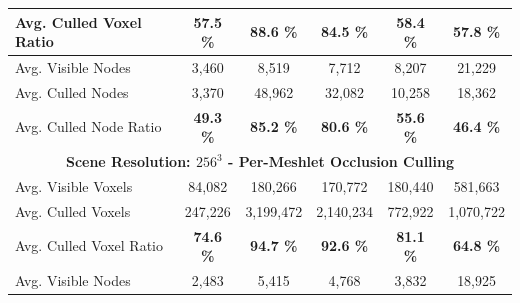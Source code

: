 \begin{table}[!htb]
\begin{tabular}{|lccccc|}
    \multicolumn{1}{|l|}{Avg. Culled Voxel Ratio}   & \multicolumn{1}{c|}{\textbf{57.5 \%}}         & \multicolumn{1}{c|}{\textbf{88.6 \%}}         & \multicolumn{1}{c|}{\textbf{84.5 \%}} & \multicolumn{1}{c|}{\textbf{58.4 \%}}     & \multicolumn{1}{c|}{\textbf{57.8 \%}}     \\ \hline
    \multicolumn{1}{|l|}{Avg. Visible Nodes}        & \multicolumn{1}{c|}{3,460}                    & \multicolumn{1}{c|}{8,519}                    & \multicolumn{1}{c|}{7,712}            & \multicolumn{1}{c|}{8,207}                & \multicolumn{1}{c|}{21,229}               \\
    \multicolumn{1}{|l|}{Avg. Culled Nodes}         & \multicolumn{1}{c|}{3,370}                    & \multicolumn{1}{c|}{48,962}                   & \multicolumn{1}{c|}{32,082}           & \multicolumn{1}{c|}{10,258}               & \multicolumn{1}{c|}{18,362}               \\
    \multicolumn{1}{|l|}{Avg. Culled Node Ratio}    & \multicolumn{1}{c|}{\textbf{49.3 \%}}         & \multicolumn{1}{c|}{\textbf{85.2 \%}}         & \multicolumn{1}{c|}{\textbf{80.6 \%}} & \multicolumn{1}{c|}{\textbf{55.6 \%}}     & \multicolumn{1}{c|}{\textbf{46.4 \%}}     \\ \hline
    \multicolumn{6}{|c|}{\textbf{Scene Resolution: $256^3$ - Per-Meshlet Occlusion Culling}}                                                                                                                                                                                        \\ \hline
    \multicolumn{1}{|l|}{Avg. Visible Voxels}       & \multicolumn{1}{c|}{84,082}                   & \multicolumn{1}{c|}{180,266}                  & \multicolumn{1}{c|}{170,772}          & \multicolumn{1}{c|}{180,440}              & \multicolumn{1}{c|}{581,663}              \\
    \multicolumn{1}{|l|}{Avg. Culled Voxels}        & \multicolumn{1}{c|}{247,226}                  & \multicolumn{1}{c|}{3,199,472}                & \multicolumn{1}{c|}{2,140,234}        & \multicolumn{1}{c|}{772,922}              & \multicolumn{1}{c|}{1,070,722}            \\
    \multicolumn{1}{|l|}{Avg. Culled Voxel Ratio}   & \multicolumn{1}{c|}{\textbf{74.6 \%}}         & \multicolumn{1}{c|}{\textbf{94.7 \%}}         & \multicolumn{1}{c|}{\textbf{92.6 \%}} & \multicolumn{1}{c|}{\textbf{81.1 \%}}     & \multicolumn{1}{c|}{\textbf{64.8 \%}}     \\ \hline
    \multicolumn{1}{|l|}{Avg. Visible Nodes}        & \multicolumn{1}{c|}{2,483}                    & \multicolumn{1}{c|}{5,415}                    & \multicolumn{1}{c|}{4,768}            & \multicolumn{1}{c|}{3,832}                & \multicolumn{1}{c|}{18,925}               \\

\end{tabular}
\end{table}
